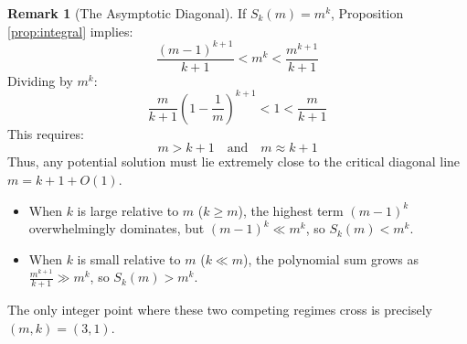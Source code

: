\documentclass[11pt,a4paper]{article}
\theoremstyle{definition}
\newtheorem{remark}[theorem]{Remark}
\begin{document}
\begin{remark}[The Asymptotic Diagonal]
If $S_k(m) = m^k$, Proposition \ref{prop:integral} implies:
\[ \frac{(m-1)^{k+1}}{k+1} < m^k < \frac{m^{k+1}}{k+1} \]
Dividing by $m^k$:
\[ \frac{m}{k+1} \left(1 - \frac{1}{m}\right)^{k+1} < 1 < \frac{m}{k+1} \]
This requires:
\begin{equation}\label{eq:critical_diag}
m > k+1 \quad \text{and} \quad m \approx k+1
\end{equation}
Thus, any potential solution must lie extremely close to the critical diagonal line $m = k + 1 + O(1)$.

\begin{itemize}
    \item When $k$ is large relative to $m$ ($k \ge m$), the highest term $(m-1)^k$ overwhelmingly dominates, but $(m-1)^k \ll m^k$, so $S_k(m) < m^k$.
    \item When $k$ is small relative to $m$ ($k \ll m$), the polynomial sum grows as $\frac{m^{k+1}}{k+1} \gg m^k$, so $S_k(m) > m^k$.
\end{itemize}
The only integer point where these two competing regimes cross is precisely $(m, k) = (3, 1)$.
\end{remark}
\end{document}
